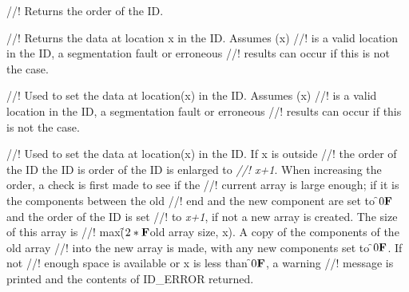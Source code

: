//! Returns the order of the ID.


//! Returns the data at location \p x in the ID. Assumes (\p x)
//! is a valid location in the ID, a segmentation fault or erroneous
//! results can occur if this is not the case.

//! Used to set the data at location(\p x) in the ID. Assumes (\p x)
//! is a valid location in the ID, a segmentation fault or erroneous
//! results can occur if this is not the case.

//! Used to set the data at location(\p x) in the ID. If \p x is outside
//! the order of the ID the ID is order of the ID is enlarged to {\em
//! x+1}. When increasing the order, a check is first made to see if the
//! current array is large enough; if it is the components between the old
//! end and the new component are set to \f$0{\bf F}$ and the order of the ID is set
//! to {\em x+1}, if not a new array is created. The size of this array is
//! max(\f$2*{\bf F}$old array size, x). A copy of the components of the old array
//! into the new array is made, with any new components set to \f$0{\bf F}$. If not
//! enough space is available or \p x is less than \f$0{\bf F}$, a warning
//! message is printed and the contents of ID\_ERROR returned.


